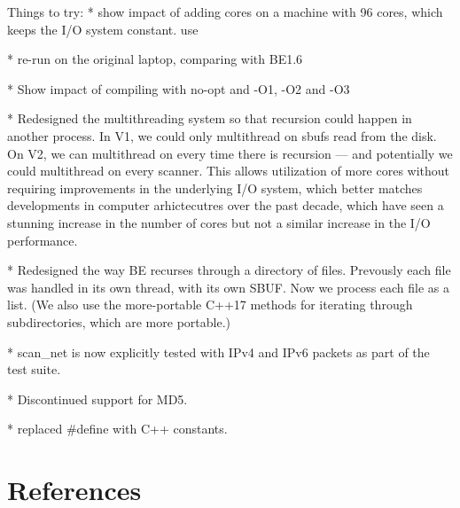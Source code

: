 \documentclass[5p]{elsarticle}
\begin{document}
Things to try:
* show impact of adding cores on a machine with 96 cores, which keeps
the I/O system constant.  use

* re-run on the original laptop, comparing with BE1.6

* Show impact of compiling with no-opt and -O1, -O2 and -O3

* Redesigned the multithreading system so that recursion could happen
in another process. In V1, we could only multithread on sbufs read
from the disk. On V2, we can multithread on every time there is
recursion --- and potentially we could multithread on every
scanner. This allows utilization of more cores without requiring
improvements in the underlying I/O system, which better matches
developments in computer arhictecutres over the past decade, which
have seen a stunning increase in the number of cores but not a similar
increase in the I/O performance.

* Redesigned the way BE recurses through a directory of
files. Prevously each file was handled in its own thread, with its own
SBUF. Now we process each file as a list. (We also use the
more-portable C++17 methods for iterating through subdirectories,
which are more portable.)

* scan_net is now explicitly tested with IPv4 and IPv6 packets as part
of the test suite.

* Discontinued support for MD5.

* replaced #define with C++ constants.


\section*{References}


\end{document}
